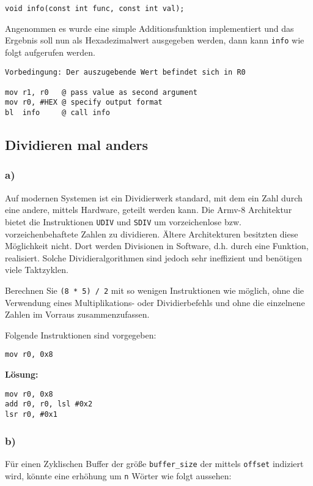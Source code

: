 \documentclass[12pt]{article}
\begin{document}
\begin{lstlisting}
void info(const int func, const int val);
\end{lstlisting}

Angenommen es wurde eine simple Additionsfunktion implementiert und das Ergebnis
soll nun als Hexadezimalwert ausgegeben werden, dann kann \texttt{info} wie
folgt aufgerufen werden.

\begin{lstlisting}
Vorbedingung: Der auszugebende Wert befindet sich in R0

mov r1, r0   @ pass value as second argument
mov r0, #HEX @ specify output format
bl  info     @ call info
\end{lstlisting}


\subsection{Dividieren mal anders}
\subsubsection{a)}
Auf modernen Systemen ist ein Dividierwerk standard, mit dem ein Zahl durch eine
andere, mittels Hardware, geteilt werden kann. Die Armv-8 Architektur bietet
die Instruktionen \texttt{UDIV} und \texttt{SDIV} um vorzeichenlose bzw.
vorzeichenbehaftete Zahlen zu dividieren. Ältere Architekturen besitzten diese
Möglichkeit nicht. Dort werden Divisionen in Software, d.h. durch eine Funktion, realisiert. 
Solche Dividieralgorithmen sind jedoch sehr ineffizient und benötigen viele
Taktzyklen.

Berechnen Sie \texttt{(8 * 5) / 2} mit so wenigen Instruktionen wie
möglich, ohne die Verwendung eines Multiplikations- oder Dividierbefehls und
ohne die einzelnene Zahlen im Vorraus zusammenzufassen.

Folgende Instruktionen sind vorgegeben:
\begin{lstlisting}
mov r0, 0x8
\end{lstlisting}

\textbf{Lösung:}
\begin{lstlisting}
mov r0, 0x8
add r0, r0, lsl #0x2
lsr r0, #0x1
\end{lstlisting}

\subsubsection{b)}
Für einen Zyklischen Buffer der größe \texttt{buffer\_size} der mittels
\texttt{offset} indiziert wird, könnte eine erhöhung um \texttt{n} Wörter wie
folgt aussehen:
\end{document}
